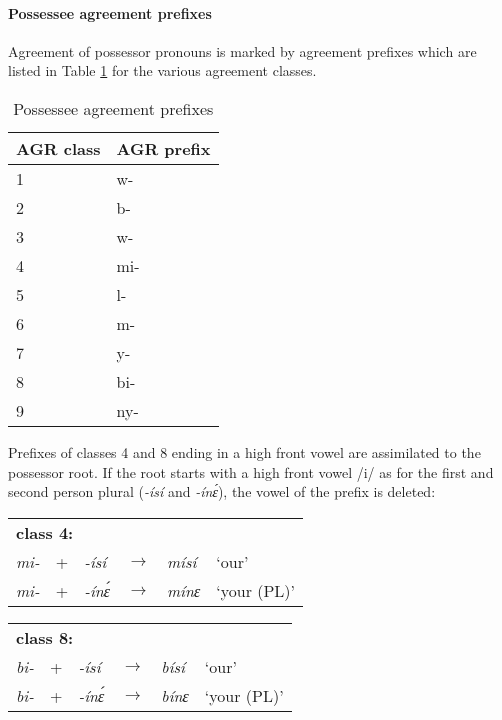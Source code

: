 \paragraph{Possessee agreement prefixes} Agreement of possessor pronouns is marked by agreement prefixes which are listed in Table \ref{Tab:PossPre} for the various agreement classes.

\begin{table} 
\centering
\begin{tabular}{ll}
 \midrule
AGR class & AGR prefix \\
  \midrule
 1 & w-  \\
 2 & b- \\
 3 & w- \\
4 & mi- \\
5 & l- \\
6 & m- \\
7 & y- \\
8 & bi- \\
9 & ny- \\
  \midrule
\end{tabular}
\caption{Possessee agreement prefixes}
\label{Tab:PossPre}
\end{table}

\noindent Prefixes of classes 4 and 8 ending in a high front vowel are assimilated to the possessor root. If the root starts with a high front vowel /i/ as for the first and second person plural ({\itshape -ísí} and {\itshape -ínɛ́}), the vowel of the prefix is deleted:

\begin{exe} \ex\label{POSS41}
\begin{tabular}{llllll}
\multicolumn{6}{l}{\bfseries class 4:} \\
 {\itshape mi-} & + & {\itshape -ísí} & $\rightarrow$ &  {\itshape mísí} & `our' \\
 {\itshape mi-} & + & {\itshape -ínɛ́} & $\rightarrow$ & {\itshape mínɛ} & `your (PL)' \\
\end{tabular}
\end{exe}

\begin{exe} \ex\label{POSS81}
\begin{tabular}{llllll}
\multicolumn{6}{l}{\bfseries class 8:}  \\
 {\itshape bi-} & + & {\itshape -ísí} & $\rightarrow$ &  {\itshape bísí} & `our' \\
 {\itshape bi-} & + & {\itshape -ínɛ́} & $\rightarrow$ & {\itshape bínɛ} & `your (PL)' \\
\end{tabular}
\end{exe}

